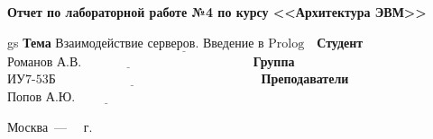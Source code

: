 \documentclass[a4paper,14pt, unknownkeysallowed]{extreport}
\begin{document}
\begin{titlepage}
\begin{center}
    \Large\textbf{Отчет по лабораторной работе №4 по курсу <<Архитектура ЭВМ>>}\newline
\end{center}
gs
\noindent\textbf{Тема} $\underline{\text{Взаимодействие серверов. Введение в Prolog~~}}$\newline\newline
\noindent\textbf{Студент} $\underline{\text{Романов А.В.~~~~~~~~~~~~~~~~~~~~~~~~~~~~~~~~~~~~~~~~}}$\newline\newline
\noindent\textbf{Группа} $\underline{\text{ИУ7-53Б~~~~~~~~~~~~~~~~~~~~~~~~~~~~~~~~~~~~~~~~~~~~~~~~}}$\newline\newline
\noindent\textbf{Преподаватели} $\underline{\text{Попов А.Ю.~~~~~~~~~~~~~~~~~~~~~~~~~~~~~~~}}$\newline

\begin{center}
    \vfill
    Москва~---~\the\year
    ~г.
\end{center}
\restoregeometry
\end{titlepage}
\end{document}
